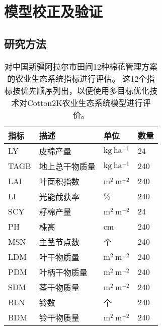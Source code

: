 \chapter{模型校正及验证}

\section{研究方法}
\begin{table}
    \caption{对中国新疆阿拉尔市田间12种棉花管理方案的农业生态系统指标进行评估。
        这12个指标按优先顺序列出，以便使用多目标优化技术对Cotton2K农业生态系统模型进行评价。}
    \centering
    \begin{tabular}{llll}
        \toprule
        指标 & 描述           & 单位                   & 数量 \\
        \midrule
        LY   & 皮棉产量       & $\mathrm{kg\ ha^{-1}}$ & 24   \\
        TAGB & 地上总干物质量 & $\mathrm{kg\ ha^{-1}}$ & 240  \\
        LAI  & 叶面积指数     & $\mathrm{m^2\ m^{-2}}$ & 240  \\
        LI   & 光能截获率     & \%                     & 240  \\
        SCY  & 籽棉产量       & $\mathrm{m^2\ m^{-2}}$ & 24   \\
        PH   & 株高           & cm                     & 240  \\
        MSN  & 主茎节点数     & 个                     & 240  \\
        LDM  & 叶干物质量     & $\mathrm{m^2\ m^{-2}}$ & 240  \\
        PDM  & 叶柄干物质量   & $\mathrm{m^2\ m^{-2}}$ & 240  \\
        SDM  & 茎干物质量     & $\mathrm{m^2\ m^{-2}}$ & 240  \\
        BLN  & 铃数           & 个                     & 240  \\
        BDM  & 铃干物质量     & $\mathrm{m^2\ m^{-2}}$ & 240  \\
        \bottomrule
    \end{tabular}
\end{table}

